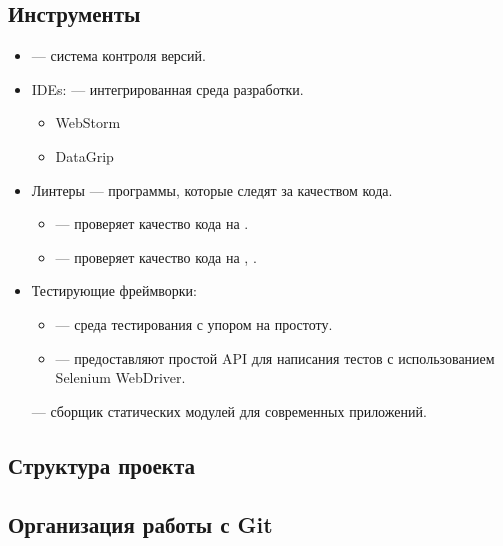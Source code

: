 \subsection{Инструменты}
\begin{itemize}
    \item \textcite{git} --- система контроля версий.
    \item IDEs: --- интегрированная среда разработки.
    \begin{itemize}
        \item WebStorm
        \item DataGrip
    \end{itemize}
    \item Линтеры --- программы, которые следят за качеством кода.
    \begin{itemize}
        \item \textcite{eslint} --- проверяет качество кода на \textcite{wiki:js}.
        \item \textcite{stylelint} --- проверяет качество кода на \textcite{scss}, \textcite{wiki:css}.
    \end{itemize}
    \item Тестирующие фреймворки:
    \begin{itemize}
        \item \textcite{jest} --- среда тестирования \textcite{wiki:js} с упором на простоту.
        \item \textcite{selenium-python} --- предоставляют простой API для написания тестов с использованием Selenium WebDriver.
    \end{itemize}
    \textcite{webpack} --- сборщик статических модулей для современных \textcite{wiki:js} приложений.
\end{itemize}

\subsection{Структура проекта}


\subsection{Организация работы с Git}


\clearpage